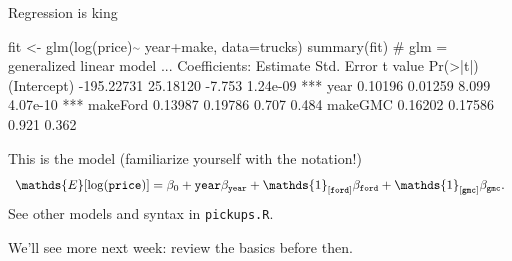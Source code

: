 \documentclass[11pt,xcolor=svgnames]{beamer}
\newcommand{\theme}{\color{Maroon}}
\newcommand{\bk}{\color{black}}
\newcommand{\gr}{\color{gray}}
\newcommand{\nv}{\color{Navy}}
\newcommand{\bs}[1]{\boldsymbol{#1}}
\newcommand{\mr}[1]{\mathrm{#1}}
\newcommand{\ds}[1]{\mathds{#1}}
\newcommand{\sk}{\vspace{.5cm}}
\newcommand{\R}[1]{{\tt \nv #1}}
\newcommand{\til}{{\footnotesize$\bs{\stackrel{\sim}{}}$ }}
\begin{document}
\begin{frame}[fragile]
{Regression is king}

{\small \nv
\begin{semiverbatim}
fit <- glm(log(price)\til{year+make}, data=trucks)
summary(fit) {\gr # glm = generalized linear model}
...\bk
Coefficients:
              Estimate Std. Error t value Pr(>|t|)    
(Intercept) -195.22731   25.18120  -7.753 1.24e-09 ***
year           0.10196    0.01259   8.099 4.07e-10 ***
makeFord       0.13987    0.19786   0.707    0.484    
makeGMC        0.16202    0.17586   0.921    0.362    
\end{semiverbatim}}

This is the model {\gr (familiarize yourself with the notation!)}
\[
\ds{E}[\log({\tt price})] = \beta_0 + {\tt year}\beta_{\tt year} + 
\ds{1}_{[\tt ford]}\beta_{\tt ford} +  \ds{1}_{[\tt gmc]}\beta_{\tt gmc}.
\]
See other models and syntax in {\tt pickups.R}.  

We'll see more next week: review the basics before then.

\end{frame}

\end{document}
